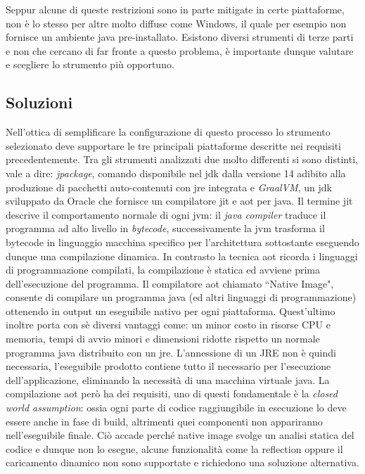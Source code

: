 Seppur alcune di queste restrizioni sono in parte mitigate in certe piattaforme, non è lo stesso per altre molto diffuse come Windows, il quale per esempio non fornisce un ambiente java pre-installato. Esistono diversi strumenti di terze parti e non che cercano di far fronte a questo problema, è importante dunque valutare e scegliere lo strumento più opportuno.

\subsection{Soluzioni}

Nell'ottica di semplificare la configurazione di questo processo lo strumento selezionato deve supportare le tre principali piattaforme descritte nei requisiti precedentemente. Tra gli strumenti analizzati due molto differenti si sono distinti, vale a dire: \textit{jpackage}, comando disponibile nel \ac{jdk} dalla versione 14 adibito alla produzione di pacchetti auto-contenuti con \ac{jre} integrata e \textit{GraalVM}, un \ac{jdk} sviluppato da Oracle che fornisce un compilatore \ac{jit} e \ac{aot} per java. Il termine \ac{jit} descrive il comportamento normale di ogni \ac{jvm}: il \textit{java compiler} traduce il programma ad alto livello in \textit{bytecode}, successivamente la \ac{jvm} trasforma il bytecode in linguaggio macchina specifico per l'architettura sottostante eseguendo dunque una compilazione dinamica. In contrasto la tecnica \ac{aot} ricorda i linguaggi di programmazione compilati, la compilazione è statica ed avviene prima dell'esecuzione del programma. Il compilatore \ac{aot} chiamato ``Native Image", consente di compilare un programma java (ed altri linguaggi di programmazione) ottenendo in output un eseguibile nativo per ogni piattaforma. Quest'ultimo inoltre porta con sè diversi vantaggi come: un minor costo in risorse CPU e memoria, tempi di avvio minori e dimensioni ridotte rispetto un normale programma java distribuito con un \ac{jre}. L'annessione di un JRE non è quindi necessaria, l'eseguibile prodotto contiene tutto il necessario per l'esecuzione dell'applicazione, eliminando la necessità di una macchina virtuale java. La compilazione \ac{aot} però ha dei requisiti, uno di questi fondamentale è la \textit{closed world assumption}: ossia ogni parte di codice raggiungibile in esecuzione lo deve essere anche in fase di build, altrimenti quei componenti non appariranno nell'eseguibile finale. Ciò accade perché native image svolge un analisi statica del codice e dunque non lo esegue, alcune funzionalità come la reflection oppure il caricamento dinamico non sono supportate e richiedono una soluzione alternativa.

